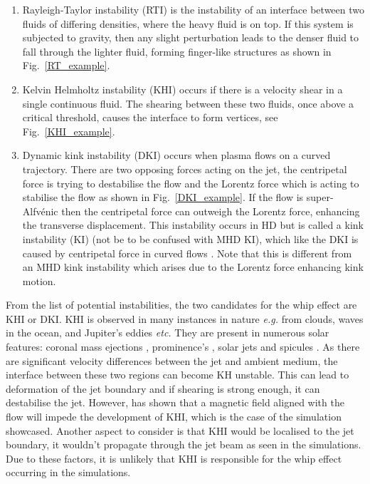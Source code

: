 \documentclass[12pt]{ociamthesis}
\newcommand{\Alfvenic}{Alfv\'{e}nic }
\newcommand{\np}{\\ \\}
\begin{document}
\begin{enumerate}
    \item Rayleigh-Taylor instability (RTI) is the instability of an interface between two fluids of differing densities, where the heavy fluid is on top. If this system is subjected to gravity, then any slight perturbation leads to the denser fluid to fall through the lighter fluid, forming finger-like structures as shown in Fig.~\ref{RT_example}.
    \item Kelvin Helmholtz instability (KHI) occurs if there is a velocity shear in a single continuous fluid. The shearing between these two fluids, once above a critical threshold, causes the interface to form vertices, see Fig.~\ref{KHI_example}.    
    \item Dynamic kink instability (DKI) occurs when plasma flows on a curved trajectory. There are two opposing forces acting on the jet, the centripetal force is trying to destabilise the flow and the Lorentz force which is acting to stabilise the flow as shown in Fig.~\ref{DKI_example}. If the flow is super-\Alfvenic then the centripetal force can outweigh the Lorentz force, enhancing the transverse displacement. This instability occurs in HD but is called a kink instability (KI) (not be to be confused with MHD KI), which like the DKI is caused by centripetal force in curved flows \citep{Drazin2002ihsbookD}. Note that this is different from an MHD kink instability which arises due to the Lorentz force enhancing kink motion.
\end{enumerate}
From the list of potential instabilities, the two candidates for the whip effect are KHI or DKI. KHI is observed in many instances in nature \textit{e.g.} from clouds, waves in the ocean, and Jupiter's eddies \textit{etc.}  They are present in numerous solar features: coronal mass ejections \citep{Foullon2011ApJ729L8F, Foullon2013ApJ767170F}, prominence's \citep{Berger2010ApJ7161288B, Ryutova2010SoPh26775R}, solar jets \citep{Filippov2015MNRAS4511117F,Li2018NatSR88136L} and spicules \citep{Kuridze2016ApJ830133K, Antolin2018ApJ85644A}. As there are significant velocity differences between the jet and ambient medium, the interface between these two regions can become KH unstable. This can lead to deformation of the jet boundary and if shearing is strong enough, it can destabilise the jet. However,  \cite{Chandrasekhar1961hhsbookC} has shown that a magnetic field aligned with the flow will impede the development of KHI, which is the case of the simulation showcased. Another aspect to consider is that KHI would be localised to the jet boundary, it wouldn't propagate through the jet beam as seen in the simulations. Due to these factors, it is unlikely that KHI is responsible for the whip effect occurring in the simulations. \np 
\end{document}
